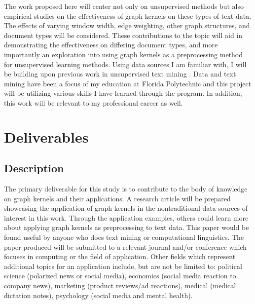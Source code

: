 \documentclass[11pt]{report}
\begin{document}
The work proposed here will center not only on unsupervised methods but also empirical studies on the effectiveness of graph kernels on these types of text data. The effects of varying window width, edge weighting, other graph structures, and document types will be considered. These contributions to the topic will aid in demonstrating the effectiveness on differing document types, and more importantly an exploration into using graph kernels as a preprocessing method for unsupervised learning methods. Using data sources I am familiar with, I will be building upon previous work in unsupervised text mining \cite{akioyamen2020framework}. Data and text mining have been a focus of my education at Florida Polytechnic and this project will be utilizing various skills I have learned through the program. In addition, this work will be relevant to my professional career as well.




\section{Deliverables}
\subsection{Description}
The primary deliverable for this study is to contribute to the body of knowledge on graph kernels and their applications. A research article will be prepared showcasing the application of graph kernels in the nontraditional data sources of interest in this work. Through the application examples, others could learn more about applying graph kernels as preprocessing to text data. This paper would be found useful by anyone who does text mining or computational linguistics. The paper produced will be submitted to a relevant journal and/or conference which focuses in computing or the field of application. Other fields which represent additional topics for an application include, but are not be limited to: political science (polarized news or social media), economics (social media reaction to company news), marketing (product reviews/ad reactions), medical (medical dictation notes), psychology (social media and mental health). 
\end{document}
